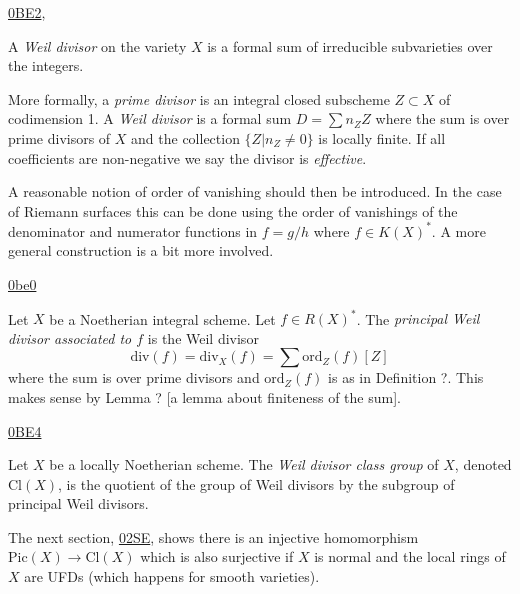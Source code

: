 \begin{definition}
\label{definition-weil-divisor}
\begin{reference}
\href{https://stacks.math.columbia.edu/tag/%
0BE2}{0BE2},
\cite[p. 130]{hart}
\end{reference}
A {\it Weil divisor} on the variety $X$ is a
formal sum of irreducible
subvarieties over the integers.

More formally, a {\it prime divisor} is an
integral closed
subscheme $Z \subset X$ of codimension 1.
A {\it Weil divisor} is a formal sum $D=\sum
n_Z Z$ where
the sum is over prime divisors of $X$
and the collection
$\{Z|n_Z \neq  0\}$ is locally finite.
If all coefficients are non-negative we say
the divisor is {\it effective}.
\end{definition}

\noindent
A reasonable notion of order of vanishing
should then be introduced. In the case of
Riemann surfaces
this can be done using the order of
vanishings
of the denominator and numerator functions in
$f=g/h$ where $f \in K(X)^*$.
A more general construction is a bit more
involved.

\begin{definition}
\label{definition-principal-weil-divisor}
\begin{reference}
\href{https://stacks.math.columbia.edu/tag/%
0be0}{0be0}
\end{reference}
Let $X$ be a Noetherian integral scheme.
Let $f \in R(X)^*$.
The {\it principal Weil divisor associated to
$f$}
is the Weil divisor
$$
\text{div}(f)=\text{div}_X(f)
=\sum \text{ord}_Z(f)[Z]
$$
where the sum is over prime divisors and
$\text{ord}_Z(f)$ is as in Definition ?.
This makes sense by Lemma ? [a lemma about
finiteness of the sum].
\end{definition}

\begin{definition}
\label{definition-weil-divisor-class-group}
\begin{reference}
\href{https://stacks.math.columbia.edu/tag/%
0BE4}{0BE4}
\end{reference}
Let $X$ be a locally Noetherian scheme.
The {\it Weil divisor class group} of $X$,
denoted
$\text{Cl}(X)$, is the quotient
of the group of Weil divisors by the subgroup
of principal
Weil divisors.
\end{definition}

\noindent
The next section,
\href{https://stacks.math.columbia.edu/tag/%
02SE}{02SE},
shows there is an injective homomorphism
$\text{Pic}(X) \to \text{Cl}(X)$
which is also surjective if $X$ is normal
and the local rings of $X$ are UFDs
(which happens for smooth varieties).

